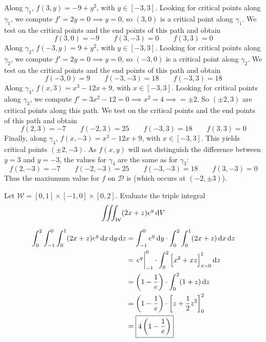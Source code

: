 \documentclass[12pt,answers]{exam}
\begin{document}
\begin{questions}
\begin{parts}
\begin{solution}
			Along $\gamma_1$, $f(3, y) = -9 + y^2$, with $y \in [-3, 3]$. 
			Looking for critical points along $\gamma_1$, we compute
			$f' = 2y = 0 \implies y = 0$, so $(3, 0)$ is a critical point along $\gamma_1$. We test on the critical points and the end points of this path and obtain
			\[
				f(3, 0) = -9 \qquad f(3, -3) = 0 \qquad f(3, 3) = 0
			\]
			Along $\gamma_2$, $f(-3, y) = 9 + y^2$, with $y \in [-3, 3]$. 
			Looking for critical points along $\gamma_2$, we compute $f' = 2y = 0 \implies y = 0$, so $(-3, 0)$ is a critical point along $\gamma_2$. 
			We test on the critical points and the end points of this path and obtain
			\[
				f(-3, 0) = 9 \qquad f(-3, -3) = 18 \qquad f(-3, 3) = 18
			\]
			Along $\gamma_3$, $f(x, 3) = x^3 - 12x + 9$, with $x \in [-3, 3]$.
			Looking for critical points along $\gamma_3$, we compute $f' = 3x^2 - 12 = 0 \implies x^2 = 4 \implies = \pm 2$. So $(\pm2, 3)$ are critical points along this path.
			We test on the critical points and the end points of this path and obtain
			\[
				f(2, 3) = -7 \qquad f(-2, 3) = 25 \qquad f(-3, 3) = 18 \qquad f(3,3) = 0
			\]
			Finally, along $\gamma_4$, $f(x, -3) = x^3 - 12x + 9$, with $x \in [-3, 3]$.
			This yields critical points $(\pm2, -3)$. As $f(x, y)$ will not distinguish the difference between $y=3$ and $y=-3$, the values for $\gamma_4$ are the same as for $\gamma_3$:
			\[
				f(2, -3) = -7 \qquad f(-2, -3) = 25 \qquad f(-3, -3) = 18 \qquad f(3,-3) = 0
			\]
			Thus the maxiumum value for $f$ on $\mathcal D$ is  (which occurs at $(-2, \pm 3)$).
		\end{solution}
	\end{parts}

	\newpage
	\question[10]
	Let $\mathcal W = [0, 1] \times [-1, 0] \times [0, 2]$. 
	Evaluate the triple integral
	\[
		\iiint_{\mathcal W} (2x + z)e^y \dif V
	\]
	\begin{solution}
		\begin{align*}
			\int_0^2 \int_{-1}^0 \int_0^1 (2x+z)e^y \dif x \dif y \dif z
			&=  \int_{-1}^0 e^y \dif y \cdot \int_0^2 \int_0^1 (2x+z) \dif x \dif z \\ 
			&= \eval{e^y}_{-1}^0 \cdot \int_0^2 \left[x^2 + xz\right]_{x=0}^1 \dif z \\ 
			&= \left(1-\frac 1e\right) \cdot \int_0^2 (1+z) \dif z \\ 
			&= \left(1-\frac 1e\right) \cdot \left[z + \frac12 z^2\right]_0^2 \\ 
			&= \boxed{4\left(1 - \frac1e\right)}
		\end{align*}
	\end{solution}


\end{questions}
\end{document}
